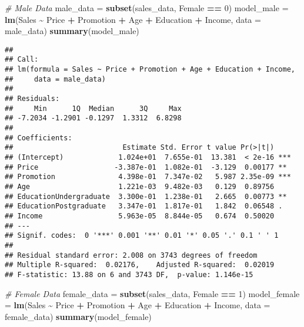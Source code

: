 \documentclass[
]{article}
\newenvironment{Shaded}{\begin{snugshade}}{\end{snugshade}}
\newcommand{\AttributeTok}[1]{\textcolor[rgb]{0.13,0.29,0.53}{#1}}
\newcommand{\CommentTok}[1]{\textcolor[rgb]{0.56,0.35,0.01}{\textit{#1}}}
\newcommand{\DecValTok}[1]{\textcolor[rgb]{0.00,0.00,0.81}{#1}}
\newcommand{\FunctionTok}[1]{\textcolor[rgb]{0.13,0.29,0.53}{\textbf{#1}}}
\newcommand{\NormalTok}[1]{#1}
\newcommand{\OtherTok}[1]{\textcolor[rgb]{0.56,0.35,0.01}{#1}}
\newcommand{\SpecialCharTok}[1]{\textcolor[rgb]{0.81,0.36,0.00}{\textbf{#1}}}
\begin{document}
\begin{Shaded}
\begin{Highlighting}[]
\CommentTok{\# Male Data}
\NormalTok{male\_data }\OtherTok{=} \FunctionTok{subset}\NormalTok{(sales\_data, Female }\SpecialCharTok{==} \DecValTok{0}\NormalTok{)}
\NormalTok{model\_male }\OtherTok{=} \FunctionTok{lm}\NormalTok{(Sales }\SpecialCharTok{\textasciitilde{}}\NormalTok{ Price }\SpecialCharTok{+}\NormalTok{ Promotion }\SpecialCharTok{+}\NormalTok{ Age }\SpecialCharTok{+}\NormalTok{ Education }\SpecialCharTok{+}\NormalTok{ Income, }\AttributeTok{data =}\NormalTok{ male\_data)}
\FunctionTok{summary}\NormalTok{(model\_male)}
\end{Highlighting}
\end{Shaded}

\begin{verbatim}
## 
## Call:
## lm(formula = Sales ~ Price + Promotion + Age + Education + Income, 
##     data = male_data)
## 
## Residuals:
##     Min      1Q  Median      3Q     Max 
## -7.2034 -1.2901 -0.1297  1.3312  6.8298 
## 
## Coefficients:
##                          Estimate Std. Error t value Pr(>|t|)    
## (Intercept)             1.024e+01  7.655e-01  13.381  < 2e-16 ***
## Price                  -3.387e-01  1.082e-01  -3.129  0.00177 ** 
## Promotion               4.398e-01  7.347e-02   5.987 2.35e-09 ***
## Age                     1.221e-03  9.482e-03   0.129  0.89756    
## EducationUndergraduate  3.300e-01  1.238e-01   2.665  0.00773 ** 
## EducationPostgraduate   3.347e-01  1.817e-01   1.842  0.06548 .  
## Income                  5.963e-05  8.844e-05   0.674  0.50020    
## ---
## Signif. codes:  0 '***' 0.001 '**' 0.01 '*' 0.05 '.' 0.1 ' ' 1
## 
## Residual standard error: 2.008 on 3743 degrees of freedom
## Multiple R-squared:  0.02176,    Adjusted R-squared:  0.02019 
## F-statistic: 13.88 on 6 and 3743 DF,  p-value: 1.146e-15
\end{verbatim}

\begin{Shaded}
\begin{Highlighting}[]
\CommentTok{\# Female Data}
\NormalTok{female\_data }\OtherTok{=} \FunctionTok{subset}\NormalTok{(sales\_data, Female }\SpecialCharTok{==} \DecValTok{1}\NormalTok{)}
\NormalTok{model\_female }\OtherTok{=} \FunctionTok{lm}\NormalTok{(Sales }\SpecialCharTok{\textasciitilde{}}\NormalTok{ Price }\SpecialCharTok{+}\NormalTok{ Promotion }\SpecialCharTok{+}\NormalTok{ Age }\SpecialCharTok{+}\NormalTok{ Education }\SpecialCharTok{+}\NormalTok{ Income, }\AttributeTok{data =}\NormalTok{ female\_data)}
\FunctionTok{summary}\NormalTok{(model\_female)}
\end{Highlighting}
\end{Shaded}
\end{document}

